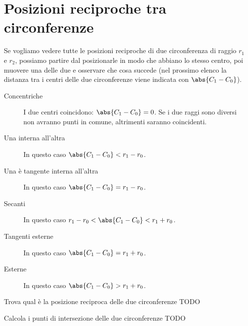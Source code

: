 \section{Posizioni reciproche tra circonferenze}
\label{sec:circ_posizionireciproche}

Se vogliamo vedere tutte le posizioni reciproche di due circonferenza  
di raggio \(r_1\) e \(r_2\), possiamo partire dal posizionarle in modo che 
abbiano lo stesso centro, poi muovere una delle due e osservare che cosa 
succede (nel prossimo elenco la distanza tra i centri delle due circonferenze 
viene indicata con \(\abs{C_1 - C_0}\)).

\begin{description} %
 \item [Concentriche]
I due centri coincidono: \(\abs{C_1 - C_0} = 0\).
Se i due raggi sono diversi non avranno punti in comune, altrimenti saranno 
coincidenti.
 \item [Una interna all'altra]
In questo caso \(\abs{C_1 - C_0} < r_1 - r_0\).
 \item [Una è tangente interna all'altra]
In questo caso \(\abs{C_1 - C_0} = r_1 - r_0\).
 \item [Secanti]
In questo caso \(r_1 - r_0 < \abs{C_1 - C_0} < r_1 + r_0\).
 \item [Tangenti esterne]
In questo caso \(\abs{C_1 - C_0} = r_1 + r_0\).
 \item [Esterne]
In questo caso \(\abs{C_1 - C_0} > r_1 + r_0\).
\end{description}

\begin{esempio}
Trova qual è la posizione reciproca delle due circonferenze TODO
\end{esempio}

\begin{esempio}
Calcola i punti di intersezione delle due circonferenze TODO
\end{esempio}




